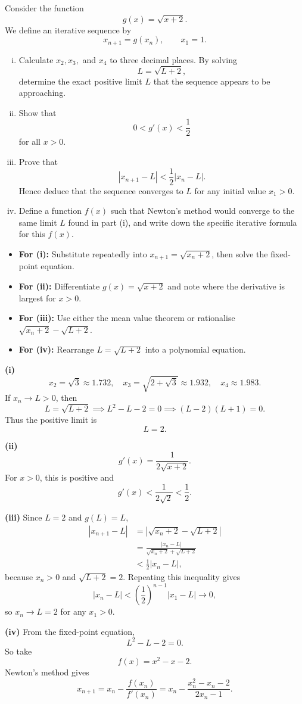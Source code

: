 \begin{problem}
Consider the function
\[
g(x)=\sqrt{x+2}.
\]
We define an iterative sequence by
\[
x_{n+1}=g(x_n),\qquad x_1=1.
\]

\begin{enumerate}[(i)]
\item Calculate $x_2,x_3,$ and $x_4$ to three decimal places. By solving
\[
L=\sqrt{L+2},
\]
determine the exact positive limit $L$ that the sequence appears to be approaching.
\item Show that
\[
0<g'(x)<\frac12
\]
for all $x>0$.
\item Prove that
\[
|x_{n+1}-L|<\frac12|x_n-L|.
\]
Hence deduce that the sequence converges to $L$ for any initial value $x_1>0$.
\item Define a function $f(x)$ such that Newton's method would converge to the same limit $L$ found in part (i), and write down the specific iterative formula for this $f(x)$.
\end{enumerate}
\end{problem}
\newpage
\begin{hint}
\begin{itemize}
\item \textbf{For (i):} Substitute repeatedly into $x_{n+1}=\sqrt{x_n+2}$, then solve the fixed-point equation.
\item \textbf{For (ii):} Differentiate $g(x)=\sqrt{x+2}$ and note where the derivative is largest for $x>0$.
\item \textbf{For (iii):} Use either the mean value theorem or rationalise $\sqrt{x_n+2}-\sqrt{L+2}$.
\item \textbf{For (iv):} Rearrange $L=\sqrt{L+2}$ into a polynomial equation.
\end{itemize}
\end{hint}
\begin{solution}
\textbf{(i)}
\[
x_2=\sqrt3\approx1.732,\quad
x_3=\sqrt{2+\sqrt3}\approx1.932,\quad
x_4\approx1.983.
\]
If $x_n\to L>0$, then
\[
L=\sqrt{L+2}\implies L^2-L-2=0
\implies (L-2)(L+1)=0.
\]
Thus the positive limit is
\[
L=2.
\]

\textbf{(ii)}
\[
g'(x)=\frac{1}{2\sqrt{x+2}}.
\]
For $x>0$, this is positive and
\[
g'(x)<\frac{1}{2\sqrt2}<\frac12.
\]

\textbf{(iii)} Since $L=2$ and $g(L)=L$,
\[
\begin{aligned}
|x_{n+1}-L|
&=\left|\sqrt{x_n+2}-\sqrt{L+2}\right|\\
&=\frac{|x_n-L|}{\sqrt{x_n+2}+\sqrt{L+2}}\\
&<\frac12|x_n-L|,
\end{aligned}
\]
because $x_n>0$ and $\sqrt{L+2}=2$. Repeating this inequality gives
\[
|x_n-L|<\left(\frac12\right)^{n-1}|x_1-L|\to0,
\]
so $x_n\to L=2$ for any $x_1>0$.

\textbf{(iv)} From the fixed-point equation,
\[
L^2-L-2=0.
\]
So take
\[
f(x)=x^2-x-2.
\]
Newton's method gives
\[
x_{n+1}=x_n-\frac{f(x_n)}{f'(x_n)}
=x_n-\frac{x_n^2-x_n-2}{2x_n-1}.
\]
\end{solution}

